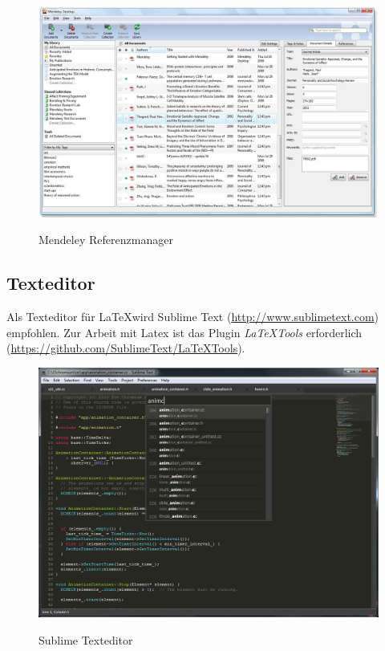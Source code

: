 \begin{figure}[hbt]
\centering
\begin{minipage}[t]{1\textwidth} %
\caption{Mendeley Referenzmanager} %
\includegraphics[width=1\textwidth]{img/Mendeley-destop-screenshot}\\ %
\end{minipage}
\end{figure}

\subsection{Texteditor}

Als Texteditor für \LaTeX wird Sublime Text (\url{http://www.sublimetext.com}) empfohlen. Zur Arbeit mit Latex ist das Plugin \emph{LaTeXTools} erforderlich (\url{https://github.com/SublimeText/LaTeXTools}).

\begin{figure}[hbt]
\centering
\begin{minipage}[t]{1\textwidth} %
\caption{Sublime Texteditor} %
\includegraphics[width=1\textwidth]{img/sublime.png}\\ %
\end{minipage}
\end{figure}

